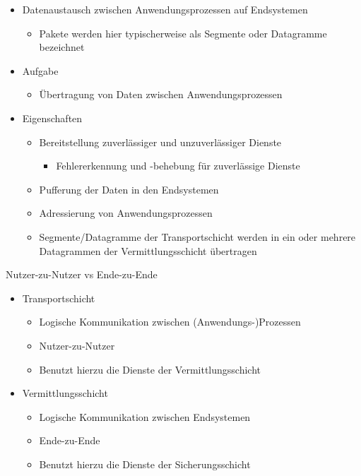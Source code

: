     \begin{itemize}
      \item Datenaustausch zwischen Anwendungsprozessen auf Endsystemen
        \begin{itemize}
          \item Pakete werden hier typischerweise als Segmente oder Datagramme bezeichnet
        \end{itemize}
      \item Aufgabe
        \begin{itemize}
          \item Übertragung von Daten zwischen Anwendungsprozessen
        \end{itemize}
      \item Eigenschaften
        \begin{itemize}
          \item Bereitstellung zuverlässiger und unzuverlässiger Dienste
            \begin{itemize}
              \item Fehlererkennung und -behebung für zuverlässige Dienste
            \end{itemize}
          \item Pufferung der Daten in den Endsystemen
          \item Adressierung von Anwendungsprozessen
          \item Segmente/Datagramme der Transportschicht werden in ein oder mehrere Datagrammen der
            Vermittlungsschicht übertragen
        \end{itemize}
    \end{itemize}
    Nutzer-zu-Nutzer vs Ende-zu-Ende
    \begin{itemize}
      \item Transportschicht
        \begin{itemize}
          \item Logische Kommunikation zwischen (Anwendungs-)Prozessen
          \item Nutzer-zu-Nutzer
          \item Benutzt hierzu die Dienste der Vermittlungsschicht
        \end{itemize}
      \item Vermittlungsschicht
        \begin{itemize}
          \item Logische Kommunikation zwischen Endsystemen
          \item Ende-zu-Ende
          \item Benutzt hierzu die Dienste der Sicherungsschicht
        \end{itemize}
    \end{itemize}
